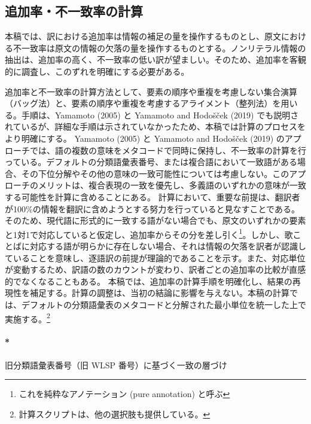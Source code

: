 \documentclass[
  letterpaper,
  DIV=11,
  numbers=noendperiod]{scrartcl}
\let\oldparagraph\paragraph
\renewcommand{\paragraph}[1]{\oldparagraph{#1}\mbox{}}
\begin{document}
\subsection{追加率・不一致率の計算}\label{ux8ffdux52a0ux7387ux4e0dux4e00ux81f4ux7387ux306eux8a08ux7b97}

本稿では、訳における追加率は情報の補足の量を操作するものとし、原文における不一致率は原文の情報の欠落の量を操作するものとする。ノンリテラル情報の抽出は、追加率の高く、不一致率の低い訳が望ましい。そのため、追加率を客観的に調査し、このずれを明確にする必要がある。

追加率と不一致率の計算方法として、要素の順序や重複を考慮しない集合演算（バッグ法）と、要素の順序や重複を考慮するアライメント（整列法）を用いる。手順は、Yamamoto
(2005) と Yamamoto and Hodošček (2019)
でも説明されているが、詳細な手順は示されていなかったため、本稿では計算のプロセスをより明確にする。
Yamamoto (2005) と Yamamoto and Hodošček (2019)
のアプローチでは、語の複数の意味をメタコードで同時に保持し、不一致率の計算を行っている。デフォルトの分類語彙表番号、または複合語において一致語がある場合、その下位分解やその他の意味の一致可能性については考慮しない。このアプローチのメリットは、複合表現の一致を優先し、多義語のいずれかの意味が一致する可能性を計算に含めることにある。
計算において、重要な前提は、翻訳者が100\%の情報を翻訳に含めようとする努力を行っていると見なすことである。そのため、現代語に形式的に一致する語がない場合でも、原文のいずれかの要素と1対1で対応していると仮定し、追加率からその分を差し引く\footnote{これを純粋なアノテーション
  (pure annotation) と呼ぶ}。しかし、歌ことばに対応する語が明らかに存在しない場合、それは情報の欠落を訳者が認識していることを意味し、逐語訳の前提が理論的であることを示す。また、対応単位が変動するため、訳語の数のカウントが変わり、訳者ごとの追加率の比較が直感的でなくなることもある。
本稿では、追加率の計算手順を明確化し、結果の再現性を補足する。計算の調整は、当初の結論に影響を与えない。本稿の計算では、デフォルトの分類語彙表のメタコードと分解された最小単位を統一した上で実施する。\footnote{計算スクリプトは、他の選択肢も提供している。}

\paragraph*{旧分類語彙表番号（旧 WLSP
番号）に基づく一致の層づけ}\label{ux65e7ux5206ux985eux8a9eux5f59ux8868ux756aux53f7ux65e7-wlsp-ux756aux53f7ux306bux57faux3065ux304fux4e00ux81f4ux306eux5c64ux3065ux3051}
\end{document}
